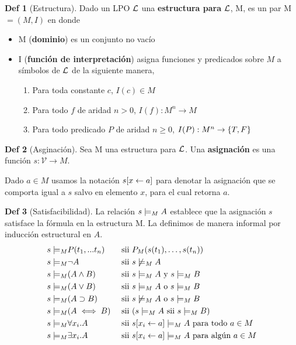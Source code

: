 \documentclass{report}
\theoremstyle{definition} %
\newtheorem*{definition*}{Def}
\newcommand{\tfunc}[2]{#1 \to #2}
\begin{document}
\begin{definition*}[Estructura]
    Dado un LPO $\mathcal{L}$ una \textbf{estructura para} $\mathcal{L}$, M, es un par M $=
    (M, I)$ en donde

    \begin{itemize}
        \item M (\textbf{dominio}) es un conjunto no vacío
        \item I (\textbf{función de interpretación}) asigna funciones y
        predicados sobre $M$ a símbolos de $\mathcal{L}$ de la siguiente manera,
        \begin{enumerate}
            \item Para toda constante $c$, $I(c) \in M$
            \item Para todo $f$ de aridad $n > 0$, $I(f): \tfunc{M^n}{M}$
            \item Para todo predicado $P$ de aridad $n \geq 0$, $I(P):
            \tfunc{M^n}{\set{T, F}}$
        \end{enumerate}
    \end{itemize}
\end{definition*}

\begin{definition*}[Asginación]
    Sea M una estructura para $\mathcal{L}$. Una \textbf{asignación} es una función $s:
    \tfunc{\mathcal{V}}{M}$.

    Dado $a\in M$ usamos la notación $s[x \gets a]$ para denotar la
    asignación que se comporta igual a $s$ salvo en elemento $x$, para el cual
    retorna $a$.
\end{definition*}

\begin{definition*}[Satisfacibilidad]
    La relación $s \models_M A$ establece que la asignación $s$ satisface la fórmula
    en la estructura M. La definimos de manera informal por inducción
    estructural en $A$.
    \begin{alignat*}{2}
        s \models_M &P(t_1, ... t_n) &&\text{ sii } P_M(s(t_1), \dots, s(t_n)) \\
        s \models_M &\neg A &&\text{ sii } s \not\models_M A \\
        s \models_M &(A \wedge B) &&\text{ sii }  s \models_M A \text{ y } s \models_M B \\
        s \models_M &(A \vee B) &&\text{ sii } s \models_M A \text{ o } s \models_M B\\
        s \models_M &(A \supset B) &&\text{ sii } 
            s \not\models_M A \text{ o } s \models_M B \\
        s \models_M &(A \iff B) &&\text{ sii }
            (s \models_M A \text{ sii } s \models_M B)\\
        s \models_M &\forall x_i . A &&\text{ sii }
            s[x_i \gets a] \models_M A \text{ para todo } a \in M\\
        s \models_M &\exists x_i . A &&\text{ sii }
            s[x_i \gets a] \models_M A \text{ para algún } a \in M
    \end{alignat*}
\end{definition*}
\end{document}

